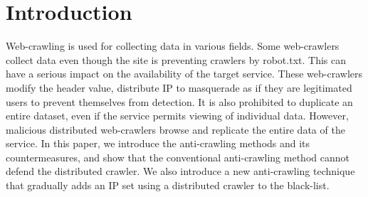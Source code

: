 \documentclass[sigconf,anonymous=false]{acmart}
\begin{document}
%
%
\section{Introduction}
Web-crawling is used for collecting data in various fields. Some web-crawlers collect data even though the site is preventing crawlers by robot.txt. This can have a serious impact on the availability of the target service. These web-crawlers modify the header value, distribute IP to masquerade as if they are legitimated users to prevent themselves from detection.
It is also prohibited to duplicate an entire dataset, even if the service permits viewing of individual data. However, malicious distributed web-crawlers browse and replicate the entire data of the service.
In this paper, we introduce the anti-crawling methods and its countermeasures, and show that the conventional anti-crawling method cannot defend the distributed crawler. We also introduce a new anti-crawling technique that gradually adds an IP set using a distributed crawler to the black-list.

%
%
\end{document}
